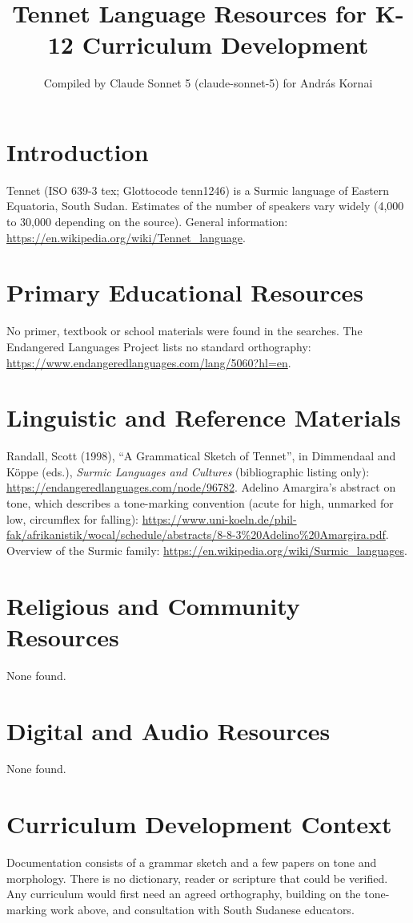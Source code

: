 \documentclass[12pt]{article}
\title{Tennet Language Resources for K-12 Curriculum Development}
\author{Compiled by Claude Sonnet 5 (claude-sonnet-5) for Andr\'as Kornai}
\date{}
\begin{document}
\maketitle

\section{Introduction}
Tennet (ISO 639-3 tex; Glottocode tenn1246) is a Surmic language of Eastern Equatoria, South Sudan. Estimates of the number of speakers vary widely (4,000 to 30,000 depending on the source). General information: \url{https://en.wikipedia.org/wiki/Tennet_language}.

\section{Primary Educational Resources}
No primer, textbook or school materials were found in the searches. The Endangered Languages Project lists no standard orthography: \url{https://www.endangeredlanguages.com/lang/5060?hl=en}.

\section{Linguistic and Reference Materials}
Randall, Scott (1998), ``A Grammatical Sketch of Tennet'', in Dimmendaal and K\"oppe (eds.), \emph{Surmic Languages and Cultures} (bibliographic listing only): \url{https://endangeredlanguages.com/node/96782}.
Adelino Amargira's abstract on tone, which describes a tone-marking convention (acute for high, unmarked for low, circumflex for falling): \url{https://www.uni-koeln.de/phil-fak/afrikanistik/wocal/schedule/abstracts/8-8-3\%20Adelino\%20Amargira.pdf}.
Overview of the Surmic family: \url{https://en.wikipedia.org/wiki/Surmic_languages}.

\section{Religious and Community Resources}
None found.

\section{Digital and Audio Resources}
None found.

\section{Curriculum Development Context}
Documentation consists of a grammar sketch and a few papers on tone and morphology. There is no dictionary, reader or scripture that could be verified. Any curriculum would first need an agreed orthography, building on the tone-marking work above, and consultation with South Sudanese educators.
\end{document}
